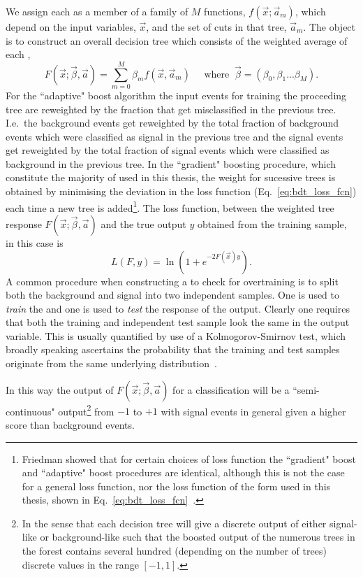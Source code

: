 We assign each \DT as a member of a family of $M$ functions, $f(\vec{x};\vec{a}_{m})$, which depend on the input variables, $\vec{x}$, and the set of cuts in that tree, $\vec{a}_{m}$. The object is to construct an overall decision tree which consists of the weighted average of each \DT,
\begin{equation}
  F(\vec{x};\vec{\beta},\vec{a}) = \sum_{m=0}^{M} \beta_{m}f(\vec{x},\vec{a}_{m}) \;\;\;\;\; \textrm{where} \;\; \vec{\beta} = (\beta_{0},\beta_{1}...\beta_{M}).
\end{equation}
For the ``adaptive" boost algorithm the input events for training the proceeding tree are reweighted by the fraction that get misclassified in the previous tree. I.e.~the background events get reweighted by the total fraction of background events which were classified as signal in the previous tree and the signal events get reweighted by the total fraction of signal events which were classified as background in the previous tree. In the ``gradient" boosting procedure, which constitute the majority of \BDTs used in this thesis, the weight for sucessive trees is obtained by minimising the deviation in the loss function (Eq.~\ref{eq:bdt_loss_fcn}) each time a new tree is added\footnote{ Friedman showed that for certain choices of loss function the ``gradient" boost and ``adaptive" boost procedures are identical, although this is not the case for a general loss function, nor the loss function of the form used in this thesis, shown in Eq.~\ref{eq:bdt_loss_fcn}~\cite{bdt3}.}. The loss function, between the weighted tree response $F(\vec{x};\vec{\beta},\vec{a})$ and the true output $y$ obtained from the training sample, in this case is
\begin{equation}
  L(F,y) = \ln(1+e^{-2F(\vec{x})y}).
  \label{eq:bdt_loss_fcn}
\end{equation}
A common procedure when constructing a \BDT to check for overtraining is to split both the background and signal into two independent samples. One is used to \emph{train} the \BDT and one is used to \emph{test} the response of the output. Clearly one requires that both the training and independent test sample look the same in the output variable. This is usually quantified by use of a Kolmogorov-Smirnov test, which broadly speaking ascertains the probability that the training and test samples originate from the same underlying distribution~\cite{kol_smir}. 

In this way the output of $F(\vec{x};\vec{\beta},\vec{a})$ for a classification \BDT will be a ``semi-continuous" output\footnote{ In the sense that each decision tree will give a discrete output of either signal-like or background-like such that the boosted output of the numerous trees in the forest contains several hundred (depending on the number of trees) discrete values in the range $[-1,1]$.} from $-1$ to $+1$ with signal events in general given a higher score than background events.

